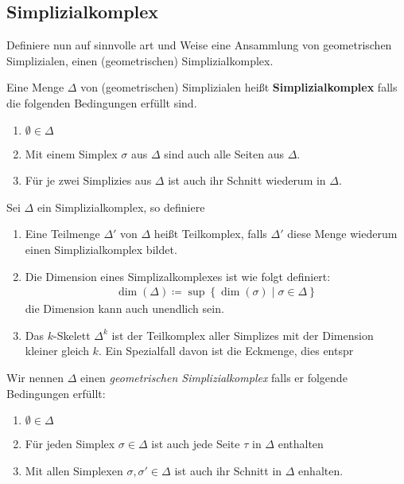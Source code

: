 \subsection{Simplizialkomplex}

Definiere nun auf sinnvolle art und Weise eine Ansammlung von
geometrischen Simplizialen, einen (geometrischen) Simplizialkomplex.

\begin{Def}
  Eine Menge $\Delta$ von (geometrischen) Simplizialen heißt
  \textbf{Simplizialkomplex} falls die folgenden Bedingungen erfüllt
  sind.
  \begin{enumerate}[1)]
  \item $\emptyset \in \Delta$
  \item Mit einem Simplex $\sigma$ aus $\Delta$ sind auch alle Seiten
    aus $\Delta$.
  \item Für je zwei Simplizies aus $\Delta$ ist auch ihr Schnitt
    wiederum in $\Delta$.
  \end{enumerate}
\end{Def}


\begin{Def}
  Sei $\Delta$ ein Simplizialkomplex, so definiere
  \begin{enumerate}[1)]
  \item Eine Teilmenge $\Delta'$ von $\Delta$ heißt Teilkomplex, falls
    $\Delta'$ diese Menge wiederum einen Simplizialkomplex bildet.
  \item Die Dimension eines Simplizalkomplexes ist wie folgt
    definiert:
    \begin{gather*}
      \dim(\Delta) \coloneqq \sup \left\{ \dim(\sigma) \; \Big| \;
        \sigma \in \Delta \right\}
    \end{gather*}
    die Dimension kann auch unendlich sein.
  \item Das $k$-Skelett $\Delta^k$ ist der Teilkomplex aller Simplizes
    mit der Dimension kleiner gleich $k$.  Ein Spezialfall davon ist
    die Eckmenge, dies entspr
  \end{enumerate}
\end{Def}


\begin{Def}
  Wir nennen $\Delta$ einen \textit{geometrischen Simplizialkomplex}
  falls er folgende Bedingungen erfüllt:
  \begin{enumerate}[(K1)]
  \item $\emptyset \in \Delta$
  \item Für jeden Simplex $\sigma \in \Delta$ ist auch jede Seite
    $\tau$ in $\Delta$ enthalten
  \item Mit allen Simplexen $\sigma, \sigma' \in \Delta$ ist auch ihr
    Schnitt in $\Delta$ enhalten.
  \end{enumerate}
\end{Def}

